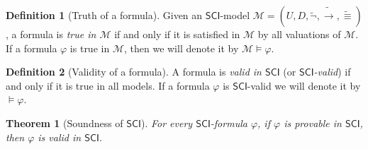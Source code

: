 \documentclass{article}
\newtheorem{theorem}{Theorem}
\theoremstyle{definition}
\newtheorem{definition}{Definition}[section]
\theoremstyle{definition}
\theoremstyle{definition}
\theoremstyle{definition}
\theoremstyle{definition}
\newcommand*{\id}{\equiv}
\newcommand*{\ra}{\rightarrow}
\newcommand{\SCI}{$\mathsf{SCI}$\xspace}
\begin{document}
\begin{definition}[Truth of a formula]
    Given an \SCI-model $\mathcal{M} = (U, D, \tilde{\lnot}, \tilde{\ra}, \tilde{\id})$, a formula is \emph{true in $\mathcal{M}$} if and only if it is satisfied in $\mathcal{M}$ by all valuations of $\mathcal{M}$. If a formula $\varphi$ is true in $\mathcal{M}$, then we will denote it by $\mathcal{M} \models \varphi$.
\end{definition}

\begin{definition}[Validity of a formula]
    A formula is \emph{valid in \SCI} (or \emph{\SCI-valid}) if and only if it is true in all models. If a formula $\varphi$ is \SCI-valid we will denote it by $ \models \varphi$.
\end{definition}

\begin{theorem}[Soundness of \SCI]
    For every \SCI-formula $\varphi$, if $\varphi$ is provable in \SCI, then $\varphi$ is valid in \SCI.
    \label{soundness}
\end{theorem}
\end{document}
